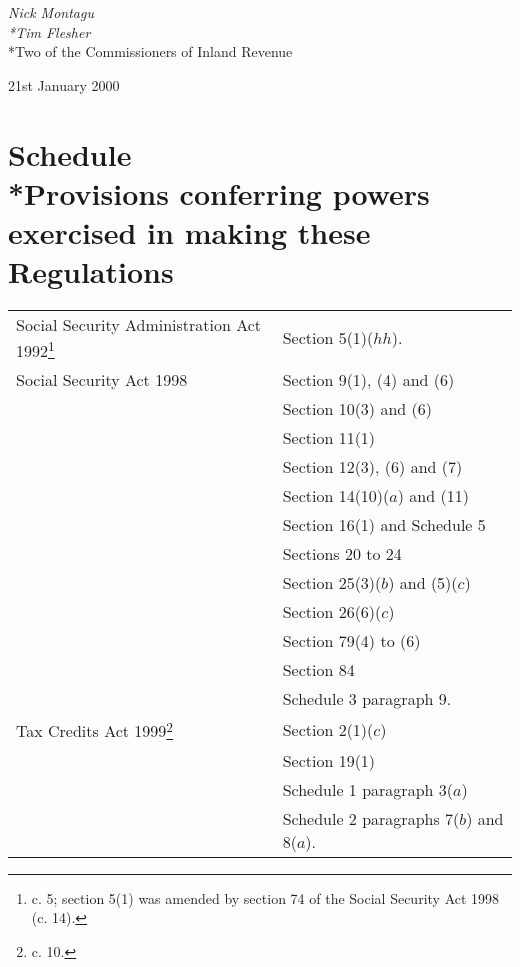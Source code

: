 \documentclass[12pt,a4paper]{article}
\begin{document}
\bigskip


{\raggedleft

\emph{Nick Montagu\\*Tim Flesher}\\*Two of the Commissioners of Inland Revenue

}

21st January 2000

\small

\part[Schedule --- Provisions conferring powers exercised in making these Regulations]{Schedule\\*Provisions conferring powers exercised in making these Regulations}

{\footnotesize

\begin{longtable}{p{181.44629pt}p{162.9498pt}}
\hline
\endhead
\hline
\endlastfoot
Social Security Administration Act 1992\footnote{\frenchspacing 1992 c. 5; section 5(1) was amended by section 74 of the Social Security Act 1998 (c. 14).}	&Section 5(1)($hh$).\\
Social Security Act 1998	&Section 9(1), (4) and (6)\\
&	Section 10(3) and (6)\\
&	Section 11(1)\\
&	Section 12(3), (6) and (7)\\
&	Section 14(10)($a$)  and (11)\\
&	Section 16(1) and Schedule 5\\
&	Sections 20 to 24\\
&	Section 25(3)($b$)  and (5)($c$) \\
&	Section 26(6)($c$) \\
&	Section 79(4) to (6)\\
&	Section 84\\
&	Schedule 3 paragraph 9.\\
Tax Credits Act 1999\footnote{\frenchspacing 1999 c. 10.}	&Section 2(1)($c$) \\
&	Section 19(1)\\
&	Schedule 1 paragraph 3($a$) \\
&	Schedule 2 paragraphs 7($b$)  and 8($a$).\\
\end{longtable}

}
\end{document}
